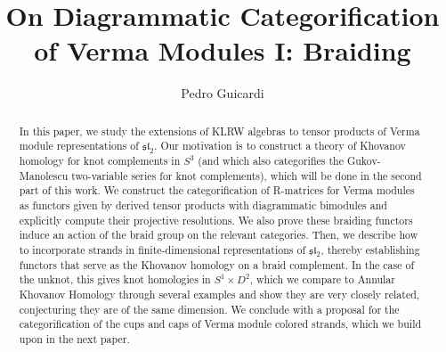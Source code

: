 \documentclass{article}
\title{On Diagrammatic Categorification of Verma Modules I: Braiding }
\author{Pedro Guicardi}
\affil{California Institute of Technology, Pasadena, CA 91125, USA}
\date{\vspace{-1cm}}
\begin{document}
\maketitle

\begin{abstract}
In this paper, we study the extensions of KLRW algebras to tensor products of Verma module representations of $\mathfrak{sl}_2$. Our motivation is to construct a theory of Khovanov homology for knot complements in $S^3$ (and which also categorifies the Gukov-Manolescu two-variable series for knot complements), which will be done in the second part of this work. We construct the categorification of R-matrices for Verma modules as functors given by derived tensor products with diagrammatic bimodules and explicitly compute their projective resolutions. We also prove these braiding functors induce an action of the braid group on the relevant categories. Then, we describe how to incorporate strands in finite-dimensional representations of $\mathfrak{sl}_2$, thereby establishing functors that serve as the Khovanov homology on a braid complement. In the case of the unknot, this gives knot homologies in $S^1\times D^2$, which we compare to Annular Khovanov Homology through several examples and show they are very closely related, conjecturing they are of the same dimension. We conclude with a proposal for the categorification of the cups and caps of Verma module colored strands, which we build upon in the next paper.

\end{abstract}

\tableofcontents
\newpage
\end{document}
